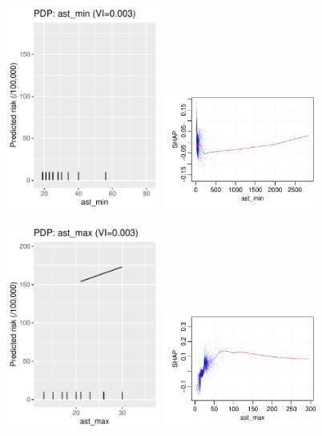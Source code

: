\documentclass[12pt]{article}
\begin{document}
\begin{figure}[h]
\centering
\includegraphics[width=0.45\textwidth]{figures/pdp/ast_min.pdf}
\includegraphics[width=0.45\textwidth]{figures/shap/ast_min.pdf}
\end{figure}
\begin{figure}[h]
\centering
\includegraphics[width=0.45\textwidth]{figures/pdp/ast_max.pdf}
\includegraphics[width=0.45\textwidth]{figures/shap/ast_max.pdf}
\end{figure}
\end{document}
